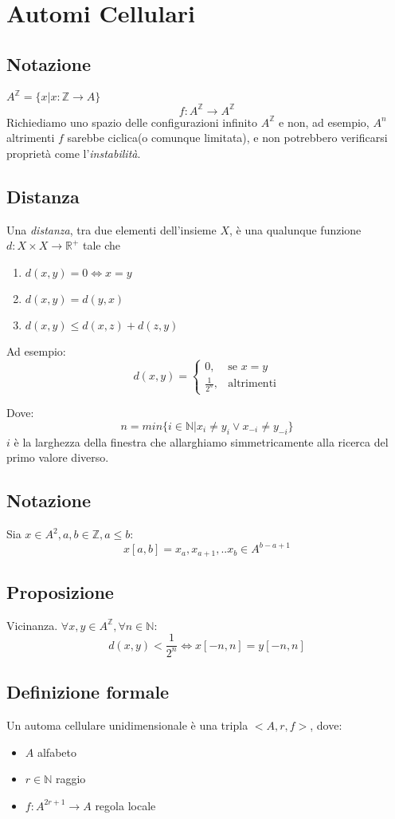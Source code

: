 \section{Automi Cellulari}
	
\subsection{Notazione} 
$A^\mathds{Z} = \{ x | x: \mathds{Z} \rightarrow A\}$
$$ f: A^\mathds{Z} \rightarrow A^\mathds{Z} $$
Richiediamo uno spazio delle configurazioni infinito $A^\mathds{Z}$ e non, ad esempio, $A^n$ altrimenti $f$ sarebbe ciclica(o comunque limitata), e non potrebbero verificarsi proprietà come l'\textit{instabilità}.

\subsection{Distanza}
Una \textit{distanza}, tra due elementi dell'insieme $X$, è una qualunque funzione $d: X \times X \rightarrow \mathds{R}^{+}$ tale che
	
\begin{enumerate}
	\item $d(x,y) = 0 \Leftrightarrow x = y$
	\item $d(x,y) = d(y,x) $
	\item $d(x,y) \leq d(x,z) + d(z,y)$
\end{enumerate}
	
Ad esempio:
\begin{equation}    
	d(x,y)= 
	\begin{cases}
	0,& \text{se } x=y\\
	\frac{1}{2^n},              & \text{altrimenti}
	\end{cases}
\end{equation}
	
Dove:
$$n = min\{ i \in \mathds{N} | x_i \neq y_i \vee x_{-i} \neq y_{-i} \} $$ $i$ 
è la larghezza della finestra che allarghiamo simmetricamente alla ricerca del primo valore diverso.
	
\subsection{Notazione} 
Sia $x \in A^2, a,b \in \mathds{Z}, a \leq b$:
$$x[a,b] = x_a, x_{a+1}, .. x_{b} \in A^{b-a+1}$$
	
	
\subsection{Proposizione} Vicinanza. $\forall x,y \in A^\mathds{Z}, \forall n \in \mathds{N}:$
\begin{equation}   d(x,y) < \frac{1}{2^n} \iff x[-n,n] = y[-n,n]
\end{equation}
	
\subsection{Definizione formale}
	
Un automa cellulare unidimensionale è una tripla $<A, r, f>$, dove:
	
\begin{itemize}
	\item $A$ alfabeto
	\item $r \in \mathds{N}$ raggio
	\item $f: A^{2r+1} \rightarrow A$ regola locale
\end{itemize}
	



